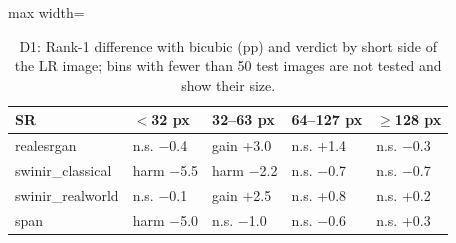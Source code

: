 \begin{table}[H]
\centering
\footnotesize
\caption{D1: Rank-1 difference with bicubic (pp) and verdict by short side of the LR image; bins with fewer than 50 test images are not tested and show their size.}
\label{tab:d1-size}
\begin{adjustbox}{max width=\linewidth}
\begin{tabular}{lllll}
\toprule
SR & $<$32 px & 32--63 px & 64--127 px & $\geq$128 px \\
\midrule
realesrgan & n.s. $-$0.4 & gain +3.0 & n.s. +1.4 & n.s. $-$0.3 \\
swinir\_classical & harm $-$5.5 & harm $-$2.2 & n.s. $-$0.7 & n.s. $-$0.7 \\
swinir\_realworld & n.s. $-$0.1 & gain +2.5 & n.s. +0.8 & n.s. +0.2 \\
span & harm $-$5.0 & n.s. $-$1.0 & n.s. $-$0.6 & n.s. +0.3 \\
\bottomrule
\end{tabular}
\end{adjustbox}
\end{table}
